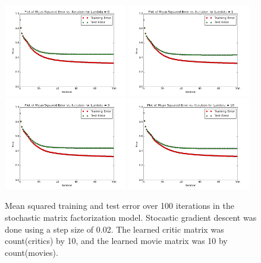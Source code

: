\documentclass[12pt]{article}
\begin{document}
	\begin{figure}[H]
	\centering
	\includegraphics[width=0.48\textwidth]{plots/test-i100d10l0.png}
	\includegraphics[width=0.48\textwidth]{plots/test-i100d10l1.png}
	\includegraphics[width=0.48\textwidth]{plots/test-i100d10l3.png}
	\includegraphics[width=0.48\textwidth]{plots/test-i100d10l10.png}
	\caption{Mean squared training and test error over 100 iterations in the stochastic matrix factorization model. Stocastic gradient descent was done using a step size of 0.02. The learned critic matrix was count(critics) by 10, and the learned movie matrix was 10 by count(movies).}
	\label{fig:10}
	\end{figure}
\end{document}
